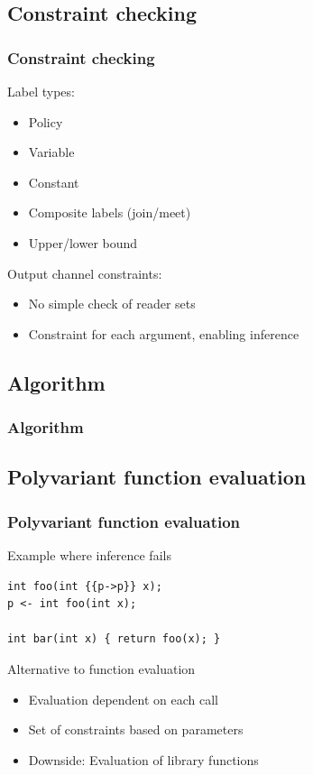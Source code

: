 \documentclass[10pt]{beamer}
\begin{document}
\subsection{Constraint checking}
\begin{frame}
  \frametitle{Constraint checking}

  Label types:
  \begin{itemize}
    \item Policy
    \item Variable
    \item Constant
    \item Composite labels (join/meet)
    \item Upper/lower bound
  \end{itemize}
  \vspace{1em}
  Output channel constraints:
  \begin{itemize}
    \item No simple check of reader sets
    \item Constraint for each argument, enabling inference
  \end{itemize}
\end{frame}

\subsection{Algorithm}
\begin{frame}
  \frametitle{Algorithm}
  \centering

  \scalebox{.9}{
  
  }
\end{frame}

\subsection{Polyvariant function evaluation}
\begin{frame}[fragile]
  \frametitle{Polyvariant function evaluation}

  Example where inference fails
\begin{lstlisting}[style=dlmc]
int foo(int {{p->p}} x);
p <- int foo(int x);

int bar(int x) { return foo(x); }
\end{lstlisting}
  \vspace{1em}
  Alternative to function evaluation
  \begin{itemize}
    \item Evaluation dependent on each call
    \item Set of constraints based on parameters
    \item Downside: Evaluation of library functions
  \end{itemize}
\end{frame}
\end{document}
